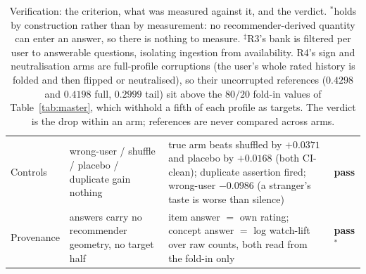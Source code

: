 \documentclass[manuscript,screen]{acmart}
\begin{document}
\begin{table}[t]
\begin{tabular}{p{1.7cm}p{3.7cm}p{6.0cm}p{1.2cm}}
\midrule
Controls & wrong-user / shuffle / placebo / duplicate gain nothing & true arm beats shuffled by $+0.0371$ and placebo by $+0.0168$ (both CI-clean); duplicate assertion fired; wrong-user $-0.0986$ (a stranger's taste is worse than silence) & \textbf{pass} \\
Provenance & answers carry no recommender geometry, no target half & item answer $=$ own rating; concept answer $=$ log watch-lift over raw counts, both read from the fold-in only & \textbf{pass}$^{*}$ \\
\bottomrule
\end{tabular}
\caption{Verification: the criterion, what was measured against it, and the verdict. $^{*}$holds by construction rather than by measurement: no recommender-derived quantity can enter an answer, so there is nothing to measure. $^\ddagger$R3's bank is filtered per user to answerable questions, isolating ingestion from availability. R4's sign and neutralisation arms are full-profile corruptions (the user's whole rated history is folded and then flipped or neutralised), so their uncorrupted references ($0.4298$ and $0.4198$ full, $0.2999$ tail) sit above the $80/20$ fold-in values of Table~\ref{tab:master}, which withhold a fifth of each profile as targets. The verdict is the drop within an arm; references are never compared across arms.}
\label{tab:battery}
\end{table}
\end{document}
